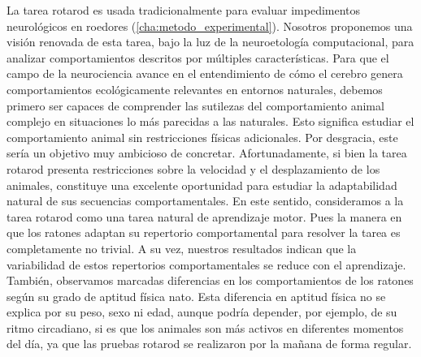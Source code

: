 La tarea rotarod es usada tradicionalmente para evaluar impedimentos neurológicos en roedores (\autoref{cha:metodo_experimental}). Nosotros proponemos una visión renovada de esta tarea, bajo la luz de la neuroetología computacional, para analizar comportamientos descritos por múltiples características. Para que el campo de la neurociencia avance en el entendimiento de cómo el cerebro genera comportamientos ecológicamente relevantes en entornos naturales, debemos primero ser capaces de comprender las sutilezas del comportamiento animal complejo en situaciones lo más parecidas a las naturales. Esto significa estudiar el comportamiento animal sin restricciones físicas adicionales. Por desgracia, este sería un objetivo muy ambicioso de concretar. Afortunadamente, si bien la tarea rotarod presenta restricciones sobre la velocidad y el desplazamiento de los animales, constituye una excelente oportunidad para estudiar la adaptabilidad natural de sus secuencias comportamentales. En este sentido, consideramos a la tarea rotarod como una tarea natural de aprendizaje motor. Pues la manera en que los ratones adaptan su repertorio comportamental para resolver la tarea es completamente no trivial. A su vez, nuestros resultados indican que la variabilidad de estos repertorios comportamentales se reduce con el aprendizaje. También, observamos marcadas diferencias en los comportamientos de los ratones según su grado de aptitud física nato. Esta diferencia en aptitud física no se explica por su peso, sexo ni edad, aunque podría depender, por ejemplo, de su ritmo circadiano, si es que los animales son más activos en diferentes momentos del día, ya que las pruebas rotarod se realizaron por la mañana de forma regular.

